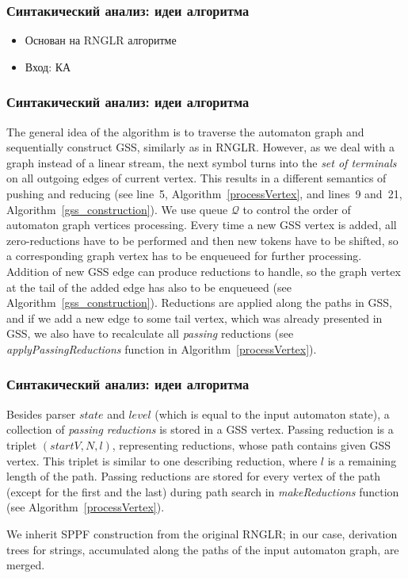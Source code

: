 \documentclass{beamer}
\begin{document}
\begin{frame}
    \transwipe[direction=90]
    \frametitle{Синтакический анализ: идеи алгоритма}
    \begin{itemize}         
        \item Основан на RNGLR алгоритме
        \item Вход: КА
    \end{itemize}
\end{frame}

\begin{frame}
    \transwipe[direction=90]
    \frametitle{Синтакический анализ: идеи алгоритма}


The general idea of the algorithm is to traverse the automaton graph and sequentially construct GSS, similarly as in RNGLR.
However, as we deal with a graph instead of a linear stream, the next symbol turns into the \emph{set of terminals} on 
all outgoing edges of current vertex. This results in a different semantics of pushing and reducing (see line~5, 
Algorithm~\ref{processVertex}, and lines~9 and~21, Algorithm~\ref{gss_construction}). We use queue $\mathcal Q$ to control the 
order of automaton graph vertices processing. Every time a new GSS vertex is added, all zero-reductions have to be performed 
and then new tokens have to be shifted, so a corresponding graph vertex has to be enqueueed for further processing. 
Addition of new GSS edge can produce reductions to handle, so the graph vertex at the tail of the added edge has 
also to be enqueueed (see Algorithm~\ref{gss_construction}). Reductions are applied along the paths in GSS, and if we add
a new edge to some tail vertex, which was already presented in GSS, we also have to recalculate all \emph{passing} reductions
(see \emph{applyPassingReductions} function in Algorithm~\ref{processVertex}).
\end{frame}

\begin{frame}
    \transwipe[direction=90]
    \frametitle{Синтакический анализ: идеи алгоритма}


Besides parser $state$ and $level$ (which is equal to the input automaton state), 
a collection of \emph{passing reductions} is stored in a GSS vertex. Passing reduction is a 
triplet $(startV, N, l)$, representing reductions, whose path contains given GSS vertex. 
This triplet is similar to one describing reduction, where $l$ is a remaining length of the path. 
Passing reductions are stored for every vertex of the path (except for the first and the last) 
during path search in \emph{makeReductions} function (see Algorithm~\ref{processVertex}).

We inherit SPPF construction from the original RNGLR; in our case, 
derivation trees for strings, accumulated along the paths of the input automaton 
graph, are merged. 
\end{frame}
\end{document}
